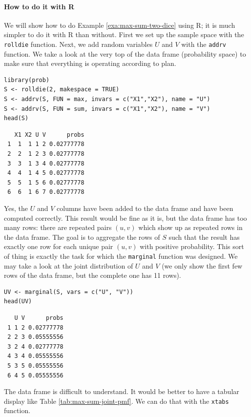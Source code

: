 \documentclass[captions=tableheading]{scrbook}
\begin{document}
\paragraph*{How to do it with \textsf{R}}

We will show how to do Example \ref{exa:max-sum-two-dice} using \textsf{R}; it is much simpler to do it with \textsf{R} than without. First we set up the sample space with the \texttt{rolldie} function. Next, we add random variables \(U\) and \(V\) with the \texttt{addrv} function. We take a look at the very top of the data frame (probability space) to make sure that everything is operating according to plan.




\begin{verbatim}
library(prob)  
S <- rolldie(2, makespace = TRUE)
S <- addrv(S, FUN = max, invars = c("X1","X2"), name = "U")
S <- addrv(S, FUN = sum, invars = c("X1","X2"), name = "V")
head(S)
\end{verbatim}

\begin{verbatim}
   X1 X2 U V      probs
 1  1  1 1 2 0.02777778
 2  2  1 2 3 0.02777778
 3  3  1 3 4 0.02777778
 4  4  1 4 5 0.02777778
 5  5  1 5 6 0.02777778
 6  6  1 6 7 0.02777778
\end{verbatim}

Yes, the \(U\) and \(V\) columns have been added to the data frame and have been computed correctly. This result would be fine as it is, but the data frame has too many rows: there are repeated pairs \((u,v)\) which show up as repeated rows in the data frame. The goal is to aggregate the rows of \(S\) such that the result has exactly one row for each unique pair \((u,v)\) with positive probability. This sort of thing is exactly the task for which the \texttt{marginal} function was designed. We may take a look at the joint distribution of \(U\) and \(V\) (we only show the first few rows of the data frame, but the complete one has 11 rows).


\begin{verbatim}
UV <- marginal(S, vars = c("U", "V"))
head(UV)
\end{verbatim}

\begin{verbatim}
   U V      probs
 1 1 2 0.02777778
 2 2 3 0.05555556
 3 2 4 0.02777778
 4 3 4 0.05555556
 5 3 5 0.05555556
 6 4 5 0.05555556
\end{verbatim}

The data frame is difficult to understand. It would be better to have a tabular display like Table \ref{tab:max-sum-joint-pmf}. We can do that with the \texttt{xtabs} function. 
\end{document}
